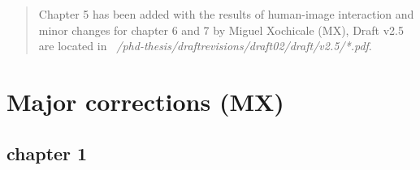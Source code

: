 \documentclass[10pt]{article}
\begin{document}
\maketitle



\begin{abstract}
Chapter 5 has been added with the results of human-image interaction
and minor changes for chapter 6 and 7 by  Miguel Xochicale (MX), 
Draft v2.5 are located in 
\emph{~/phd-thesis/draftrevisions/draft02/draft/v2.5/*.pdf}.
\end{abstract}

\tableofcontents
\newpage




\section{Major corrections (MX)}


\subsection{chapter 1}
\end{document}
